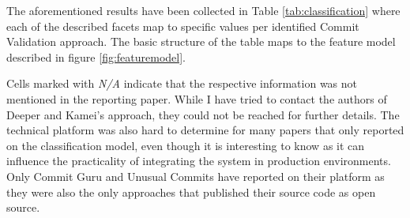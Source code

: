 The aforementioned results have been collected in Table \ref{tab:classification} where each of the described facets map to specific values per identified Commit Validation approach. The basic structure of the table maps to the feature model described in figure \ref{fig:featuremodel}. 

Cells marked with \textit{N/A} indicate that the respective information was not mentioned in the reporting paper. While I have tried to contact the authors of Deeper and Kamei's approach, they could not be reached for further details. The technical platform was also hard to determine for many papers that only reported on the classification model, even though it is interesting to know as it can influence the practicality of integrating the system in production environments. Only Commit Guru and Unusual Commits have reported on their platform as they were also the only approaches that published their source code as open source.


